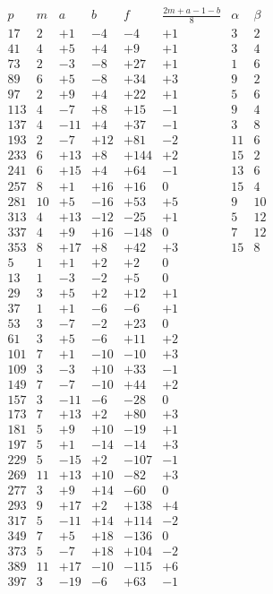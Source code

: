 \documentclass[12pt]{article}
\begin{document}
{\scriptsize
\[
\begin{array}{r|r|r|r|r|r|r|r}
p&m&a&b&f&\frac{2m+a-1-b}{8}&\alpha&\beta\\ \hline
17&2&+1&-4&-4&+1&3&2\\
41&4&+5&+4&+9&+1&3&4\\
73&2&-3&-8&+27&+1&1&6\\
89&6&+5&-8&+34&+3&9&2\\
97&2&+9&+4&+22&+1&5&6\\
113&4&-7&+8&+15&-1&9&4\\
137&4&-11&+4&+37&-1&3&8\\
193&2&-7&+12&+81&-2&11&6\\
233&6&+13&+8&+144&+2&15&2\\
241&6&+15&+4&+64&-1&13&6\\
257&8&+1&+16&+16&0&15&4\\
281&10&+5&-16&+53&+5&9&10\\
313&4&+13&-12&-25&+1&5&12\\
337&4&+9&+16&-148&0&7&12\\
353&8&+17&+8&+42&+3&15&8\\
5&1&+1&+2&+2&0&&\\
13&1&-3&-2&+5&0&&\\
29&3&+5&+2&+12&+1&&\\
37&1&+1&-6&-6&+1&&\\
53&3&-7&-2&+23&0&&\\
61&3&+5&-6&+11&+2&&\\
101&7&+1&-10&-10&+3&&\\
109&3&-3&+10&+33&-1&&\\
149&7&-7&-10&+44&+2&&\\
157&3&-11&-6&-28&0&&\\
173&7&+13&+2&+80&+3&&\\
181&5&+9&+10&-19&+1&&\\
197&5&+1&-14&-14&+3&&\\
229&5&-15&+2&-107&-1&&\\
269&11&+13&+10&-82&+3&&\\
277&3&+9&+14&-60&0&&\\
293&9&+17&+2&+138&+4&&\\
317&5&-11&+14&+114&-2&&\\
349&7&+5&+18&-136&0&&\\
373&5&-7&+18&+104&-2&&\\
389&11&+17&-10&-115&+6&&\\
397&3&-19&-6&+63&-1&&
\end{array}
\]
}
\end{document}
